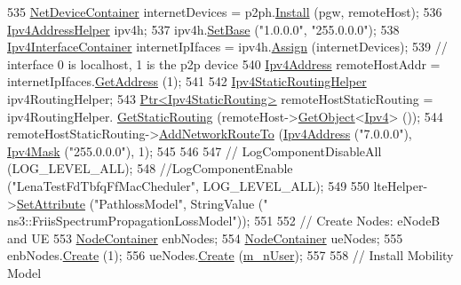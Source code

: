 \begin{DoxyCode}
535   \hyperlink{classns3_1_1NetDeviceContainer}{NetDeviceContainer} internetDevices = p2ph.\hyperlink{classns3_1_1PointToPointHelper_ab9162fea3e88722666fed1106df1f9ec}{Install} (pgw, remoteHost);
536   \hyperlink{classns3_1_1Ipv4AddressHelper}{Ipv4AddressHelper} ipv4h;
537   ipv4h.\hyperlink{classns3_1_1Ipv4AddressHelper_acf7b16dd25bac67e00f5e25f90a9a035}{SetBase} (\textcolor{stringliteral}{"1.0.0.0"}, \textcolor{stringliteral}{"255.0.0.0"});
538   \hyperlink{classns3_1_1Ipv4InterfaceContainer}{Ipv4InterfaceContainer} internetIpIfaces = ipv4h.\hyperlink{classns3_1_1Ipv4AddressHelper_af8e7f4a1a7e74c00014a1eac445a27af}{Assign} (internetDevices);
539   \textcolor{comment}{// interface 0 is localhost, 1 is the p2p device}
540   \hyperlink{classns3_1_1Ipv4Address}{Ipv4Address} remoteHostAddr = internetIpIfaces.\hyperlink{classns3_1_1Ipv4InterfaceContainer_ae63208dcd222be986822937ee4aa828c}{GetAddress} (1);
541 
542   \hyperlink{classns3_1_1Ipv4StaticRoutingHelper}{Ipv4StaticRoutingHelper} ipv4RoutingHelper;
543   \hyperlink{classns3_1_1Ptr}{Ptr<Ipv4StaticRouting>} remoteHostStaticRouting = ipv4RoutingHelper.
      \hyperlink{classns3_1_1Ipv4StaticRoutingHelper_a731206e50d305695dac7fb2ef963a4bb}{GetStaticRouting} (remoteHost->\hyperlink{classns3_1_1Object_a13e18c00017096c8381eb651d5bd0783}{GetObject}<\hyperlink{classns3_1_1Ipv4}{Ipv4}> ());
544   remoteHostStaticRouting->\hyperlink{classns3_1_1Ipv4StaticRouting_a8bf5eaa7ba49fe33c78c70d5560b6c39}{AddNetworkRouteTo} (\hyperlink{classns3_1_1Ipv4Address}{Ipv4Address} (\textcolor{stringliteral}{"7.0.0.0"}), 
      \hyperlink{classns3_1_1Ipv4Mask}{Ipv4Mask} (\textcolor{stringliteral}{"255.0.0.0"}), 1);
545 
546 
547 \textcolor{comment}{//   LogComponentDisableAll (LOG\_LEVEL\_ALL);}
548   \textcolor{comment}{//LogComponentEnable ("LenaTestFdTbfqFfMacCheduler", LOG\_LEVEL\_ALL);}
549    
550   lteHelper->\hyperlink{classns3_1_1ObjectBase_ac60245d3ea4123bbc9b1d391f1f6592f}{SetAttribute} (\textcolor{stringliteral}{"PathlossModel"}, StringValue (\textcolor{stringliteral}{"
      ns3::FriisSpectrumPropagationLossModel"}));
551 
552   \textcolor{comment}{// Create Nodes: eNodeB and UE}
553   \hyperlink{classns3_1_1NodeContainer}{NodeContainer} enbNodes;
554   \hyperlink{classns3_1_1NodeContainer}{NodeContainer} ueNodes;
555   enbNodes.\hyperlink{classns3_1_1NodeContainer_a787f059e2813e8b951cc6914d11dfe69}{Create} (1);
556   ueNodes.\hyperlink{classns3_1_1NodeContainer_a787f059e2813e8b951cc6914d11dfe69}{Create} (\hyperlink{classLenaFdTbfqFfMacSchedulerTestCase2_a7958cd8dfbb944caea78b5208a737625}{m\_nUser});
557 
558   \textcolor{comment}{// Install Mobility Model}

\end{DoxyCode}
